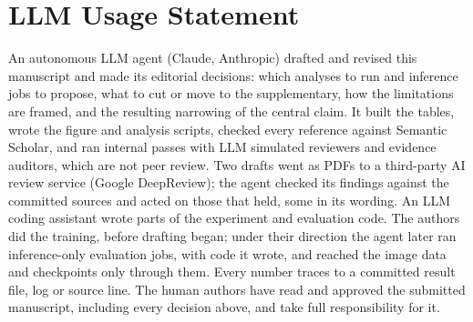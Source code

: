 \section*{LLM Usage Statement}
An autonomous LLM agent (Claude, Anthropic) drafted and revised this manuscript and made its
editorial decisions: which analyses to run and inference jobs to propose, what to cut or move to
the supplementary, how the limitations are framed, and the resulting narrowing of the central claim.
It built the tables, wrote the figure and analysis scripts, checked every reference against
Semantic Scholar, and ran internal passes with LLM simulated reviewers and evidence auditors,
which are not peer review.
Two drafts went as PDFs to a third-party AI review service (Google DeepReview); the agent
checked its findings against the committed sources and acted on those that held, some in its wording.
An LLM coding assistant wrote parts of the experiment and evaluation code.
The authors did the training, before drafting began; under their direction the agent later ran
inference-only evaluation jobs, with code it wrote, and reached the image data and checkpoints
only through them.
Every number traces to a committed result file, log or source line.
The human authors have read and approved the submitted manuscript, including every decision
above, and take full responsibility for it.

